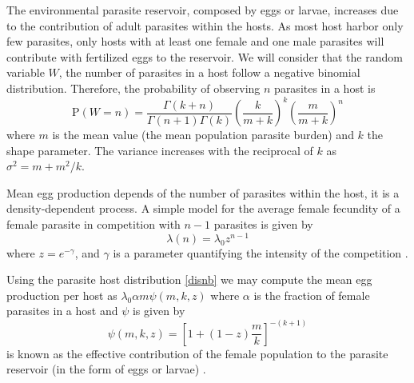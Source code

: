 \documentclass[eng]{MMSB-class-eng}
\begin{document}
The environmental parasite reservoir, composed by eggs or larvae, increases due to the contribution of adult parasites within the hosts. As most host harbor only few parasites, only hosts with at least one female and one male parasites will contribute with fertilized eggs to the reservoir. We will consider that the random variable $W$, the number of parasites in a host follow a negative binomial distribution. 
Therefore, the probability of observing $n$ parasites in a host is
\begin{equation}\label{disnb}
\mathrm{P}(W=n)=\frac{\Gamma(k+n)}{\Gamma(n+1)\Gamma(k)}\left( \frac{k}{m+k}\right) ^{k} \left( \frac{m}{m+k}\right) ^n
\end{equation}
where $m$ is the mean value (the mean population parasite burden) and $k$ the shape parameter. 
The variance increases with the reciprocal of $k$ as $\sigma^2=m+m^2/k$.

Mean egg production depends of the number of parasites within the host, it is a density-dependent process. 
A simple model for the average female fecundity of a female parasite in competition with $n-1$ parasites is given by 
$$\lambda(n)=\lambda_0 z^{n-1}$$ where $z=e^{-\gamma}$, and $\gamma$ is a parameter quantifying the intensity of the competition \citep{hall2000geographical}. 

Using the parasite host distribution \eqref{disnb} we may compute the mean egg production per host as \citep{lopez2022general}
$\lambda_0
\alpha m
\psi(m,k,z)$
where $\alpha$  is the fraction of female parasites in a host and $\psi$ is given by
\begin{equation}
\psi(m,k,z)=\left[ 1+(1-z)\dfrac{m}{k}\right]^{-(k+1)}
\end{equation}
is  known as the effective contribution of the female population to the parasite reservoir (in the form of eggs or larvae) \citep{churcher2006density}.
\end{document}
